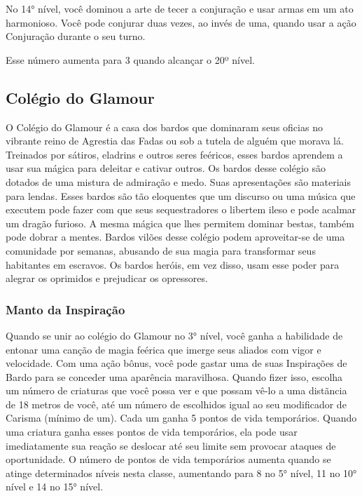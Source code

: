 \documentclass{RPG_Adventure}[2021/10/20]
\begin{document}
No 14° nível, você dominou a arte de tecer a conjuração e usar armas em um ato
harmonioso. Você pode conjurar duas vezes, ao invés de uma, quando usar a ação
Conjuração durante o seu turno.

Esse número aumenta para 3 quando alcançar o 20º nível.

\subsection{Colégio do Glamour}%
\label{sub:colegio_do_glamour}

O Colégio do Glamour é a casa dos bardos que dominaram seus oficias no vibrante
reino de Agrestia das Fadas ou sob a tutela de alguém que morava lá.  Treinados
por sátiros, eladrins e outros seres feéricos, esses bardos aprendem a usar sua
mágica para deleitar e cativar outros.
Os bardos desse colégio são dotados de uma mistura de admiração e medo. Suas
apresentações são materiais para lendas. Esses bardos são tão eloquentes que um
discurso ou uma música que executem pode fazer com que seus sequestradores o
libertem ileso e pode acalmar um dragão furioso. A mesma mágica que lhes
permitem dominar bestas, também pode dobrar a mentes. Bardos vilões desse
colégio podem aproveitar-se de uma comunidade por semanas, abusando de sua
magia para transformar seus habitantes em escravos. Os bardos heróis, em vez
disso, usam esse poder para alegrar os oprimidos e prejudicar os opressores.

\subsubsection{Manto da Inspiração}%
\label{ssub:manto_da_inspiracao}

Quando se unir ao colégio do Glamour no 3° nível, você ganha a habilidade de
entonar uma canção de magia feérica que imerge seus aliados com vigor e
velocidade.
Com uma ação bônus, você pode gastar uma de suas Inspirações de Bardo para se
conceder uma aparência maravilhosa. Quando fizer isso, escolha um número de
criaturas que você possa ver e que possam vê-lo a uma distãncia de 18 metros de
você, até um número de escolhidos igual ao seu modificador de Carisma (mínimo de
um). Cada um ganha 5 pontos de vida temporários. Quando uma criatura ganha
esses pontos de vida temporários, ela pode usar imediatamente sua reação se
deslocar até seu limite sem provocar ataques de oportunidade.
O número de pontos de vida temporários aumenta quando se atinge determinados
níveis nesta classe, aumentando para 8 no 5° nível, 11 no 10° nível e 14 no 15°
nível.
\end{document}
